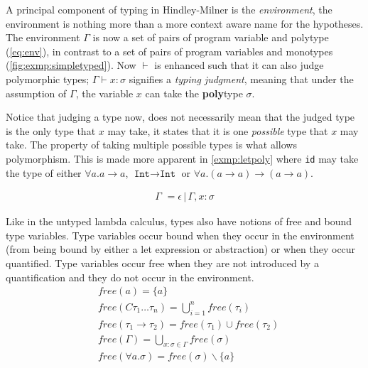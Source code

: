 A principal component of typing in Hindley-Milner is the \textit{environment}, the environment is nothing more than a more context aware name for the hypotheses.
The environment $\Gamma$ is now a set of pairs of program variable and polytype (\autoref{eq:env}), in contrast to a set of pairs of program variables and monotypes (\autoref{fig:exmp:simpletyped}).
Now $\vdash$ is enhanced such that it can also judge polymorphic types; $\Gamma \vdash x: \sigma$ signifies a \textit{typing judgment}, meaning that under the assumption of $\Gamma$, the variable $x$ can take the \textbf{poly}type $\sigma$.
\begin{remark}
    \label{remark:judgpoly}
    Notice that judging a type now, does not necessarily mean that the judged type is the only type that $x$ may take, it states that it is one \textit{possible} type that $x$ may take.
    The property of taking multiple possible types is what allows polymorphism.
    This is made more apparent in \autoref{exmp:letpoly} where \texttt{id} may take the type of either $\forall a . a \rightarrow a$, $\texttt{Int} \rightarrow \texttt{Int}$ or $\forall a . (a \rightarrow a) \rightarrow (a \rightarrow a)$.
\end{remark}
\begin{align}
	\Gamma \,\, = \epsilon \,|\, \Gamma, x : \sigma
	\label{eq:env}
\end{align}

Like in the untyped lambda calculus, types also have notions of free and bound type variables.
Type variables occur bound when they occur in the environment (from being bound by either a let expression or abstraction) or when they occur quantified.
Type variables occur free when they are not introduced by a quantification and they do not occur in the environment.
\begin{align}
	 & \textit{free}(a) = \{ a \}                                                              \tag*{}\\
	 & \textit{free}(C \tau_1 \dots \tau_n ) = \bigcup_{i = 1}^n \textit{free}(\tau_i)           \tag*{}\\
     & \textit{free}(\tau_1 \rightarrow \tau_2) = \textit{free}(\tau_1) \cup \textit{free}(\tau_2)  \tag*{}        \\
	 & \textit{free}(\Gamma) = \bigcup_{x:\sigma \in \Gamma} \textit{free}(\sigma)             \tag*{}\\
   & \textit{free}(\forall a . \sigma) = \textit{free}(\sigma) \backslash \{ a \}                     \tag*{}
\end{align}

